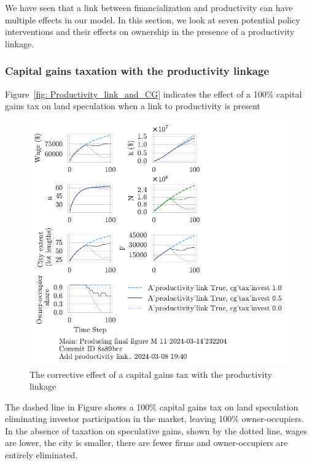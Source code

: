 We have seen that a link between financialization and productivity can have multiple effects in our model.  In this section, we look at seven potential policy interventions and their effects on ownership in the presence of a productivity linkage. 


{\color{red}

\subsubsection{Capital gains taxation with the productivity linkage}
Figure~\ref{fig: Productivity_link_and_CG} indicates the effect of a 100\% capital gains tax on land speculation when a link to productivity is present

\begin{figure}[h!tb]\label{fig-Productivity_link_and_CG}
    \centering
     \includegraphics[scale=1, trim=.25cm 2cm .25cm .25cm, clip]{fig/With-productivity_linkcg_tax_invest-232204.pdf}
    \caption{The corrective effect of a capital gains tax with the productivity linkage}
    \label{fig:Productivity_link_and_CG}
\end{figure}

The dashed line in Figure shows a 100\% capital gains tax on land speculation eliminating investor participation in the market, leaving 100\%  owner-occupiers.  In the absence of taxation on speculative gains, shown by the dotted line, wages are lower, the city is smaller, there are fewer firms and owner-occupiers are entirely eliminated. 

}

